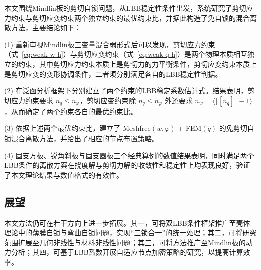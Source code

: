\documentclass[internationalmaster]{hquThesis}
\begin{document}
本文围绕Mindlin板的剪切自锁问题，从LBB稳定性条件出发，系统研究了剪切应力约束与剪切应变约束两个独立约束的最优约束比，并据此构造了免自锁的混合离散方法，主要结论如下：

(1) 重新审视Mindlin板三变量混合弱形式后可以发现，剪切应力约束（式~\eqref{eq:weak-w-h}）与剪切应变约束（式~\eqref{eq:weak-q-h}）是两个物理本质相互独立的约束，其中剪切应力约束本质上是剪切力的力平衡条件，剪切应变约束本质上是剪切应变的变形协调条件，二者须分别满足各自的LBB稳定性判据。

(2) 在泛函分析框架下分别建立了两个约束的LBB稳定系数估计式。结果表明，剪切应力约束要求 $n_q\leq n_\varphi$，剪切应变约束除 $n_q\leq n_\varphi$ 外还要求 $n_w=\bigl\langle\lfloor[n_q]\rfloor-1\bigr\rangle$，从而确定了两个约束各自的最优约束比。

(3) 依据上述两个最优约束比，建立了 Meshfree$(w,\varphi)$ + FEM$(q)$ 的免剪切自锁混合离散方法，并给出了相应的节点布置策略。

(4) 固支方板、锐角斜板与固支圆板三个经典算例的数值结果表明，同时满足两个LBB条件的离散方案在挠度解与剪切力解的收敛性和稳定性上均表现良好，验证了本文理论结果与数值格式的有效性。

\subsection{展望}

本文方法仍可在若干方向上进一步拓展。其一，可将双LBB条件框架推广至壳体理论中的薄膜自锁与弯曲自锁问题，实现``三锁合一''的统一处理；其二，可将研究范围扩展至几何非线性与材料非线性问题；其三，可将方法推广至Mindlin板的动力分析；其四，可基于LBB系数开展自适应节点加密策略的研究，以提高计算效率。

\backmatter





\end{document}
